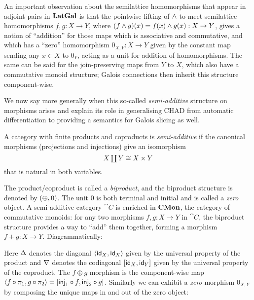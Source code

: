 An important observation about the semilattice homomorphisms that appear in adjoint pairs in $\mathbf{LatGal}$ is that
the pointwise lifting of $\wedge$ to meet-semilattice homomorphisms $f, g: X \to Y$, where $(f \wedge g)(x) =
f(x) \wedge g(x): X \to Y$, gives a notion of ``addition'' for those maps which is associative and commutative,
and which has a ``zero'' homomorphism $0_{X,Y}: X \to Y$ given by the constant map sending any $x \in X$ to
$0_Y$, acting as a unit for addition of homomorphisms. The same can be said for the join-preserving maps from
$Y$ to $X$, which also have a commutative monoid structure; Galois connections then inherit this structure
component-wise.

We now say more generally when this so-called \emph{semi-additive} structure on morphisms arises and explain
its role in generalising CHAD from automatic differentiation to providing a semantics for Galois slicing as
well.

\begin{definition}
A category with finite products and coproducts is \emph{semi-additive} if the canonical morphisms (projections
and injections) give an isomorphism
\[\textstyle X \coprod Y \cong X \times Y\] that is natural in both variables.
\end{definition}

The product/coproduct is called a \emph{biproduct}, and the biproduct structure is denoted by $(\oplus, 0)$.
The unit $0$ is both terminal and initial and is called a \emph{zero} object.  A semi-additive category $\cat{C}$ is enriched in $\mathbf{CMon}$, the
category of commutative monoids: for any two morphisms $f, g: X \to Y$ in $\cat{C}$, the biproduct structure
provides a way to ``add'' them together, forming a morphism $f + g: X \to Y$. Diagrammatically:

\begin{center}
\end{center}

Here $\Delta$ denotes the diagonal $\langle \mathsf{id}_X, \mathsf{id}_X\rangle$ given by the universal property of the product and
$\nabla$ denotes the codiagonal $[\mathsf{id}_X, \mathsf{id}_Y]$ given by the universal property of the coproduct.
The $f \oplus g$ morphism is the component-wise map $\langle f \circ \pi_1, g \circ \pi_2\rangle = [\mathsf{inj}_1
\circ f, \mathsf{inj}_2 \circ g]$. Similarly we can exhibit a \emph{zero} morphism $0_{X,Y}$ by composing the unique
maps in and out of the zero object:

